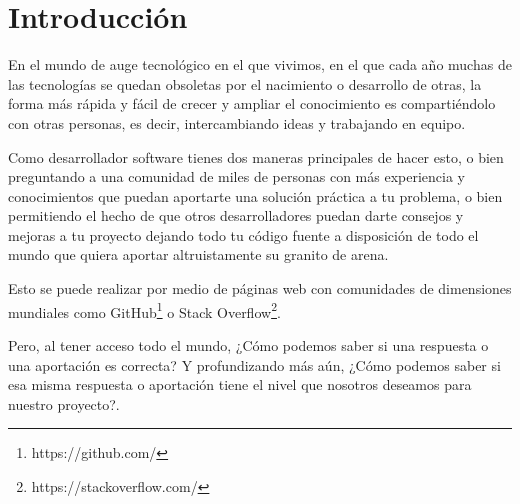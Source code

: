 \documentclass[a4paper, 12pt]{book}
\begin{document}

\tableofcontents 
\cleardoublepage
\listoffigures %



\cleardoublepage
\chapter{Introducción}
\label{sec:intro} %

En el mundo de auge tecnológico en el que vivimos, en el que cada año muchas de las tecnologías se quedan obsoletas por el nacimiento o desarrollo de otras, la forma más rápida y fácil de crecer y ampliar el conocimiento es compartiéndolo con otras personas, es decir, intercambiando ideas y trabajando en equipo.

Como desarrollador software tienes dos maneras principales de hacer esto, o bien preguntando a una comunidad de miles de personas con más experiencia y conocimientos que puedan aportarte una solución práctica a tu problema, o bien permitiendo el hecho de que otros desarrolladores puedan darte consejos y mejoras a tu proyecto dejando todo tu código fuente a disposición de todo el mundo que quiera aportar altruistamente su granito de arena.

Esto se puede realizar por medio de páginas web con comunidades de dimensiones mundiales como GitHub\footnote{https://github.com/} o Stack Overflow\footnote{https://stackoverflow.com/}.

Pero, al tener acceso todo el mundo, ¿Cómo podemos saber si una respuesta o una aportación es correcta? Y profundizando más aún, ¿Cómo podemos saber si esa misma respuesta o aportación tiene el nivel que nosotros deseamos para nuestro proyecto?.
\end{document}

